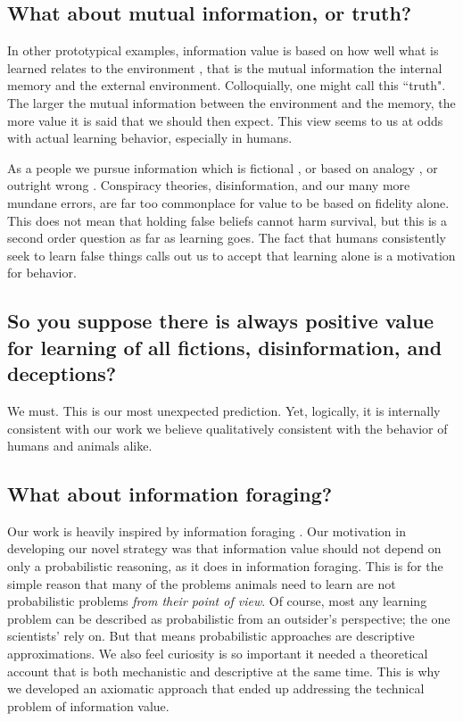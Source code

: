 \subsection*{What about mutual information, or truth?}
In other prototypical examples, information value is based on how well what is learned relates to the environment \citep{Behrens2007,Kolchinsky2018,Tishby2000}, that is the mutual information the internal memory and the external environment. Colloquially, one might call this ``truth". The larger the mutual information between the environment and the memory, the more value it is said that we should then expect. This view seems to us at odds with actual learning behavior, especially in humans. 

As a people we pursue information which is fictional \citep{sternisko2020dark}, or based on analogy \citep{gentner1997reasoning}, or outright wrong \citep{loftus1989misinformation}. Conspiracy theories, disinformation, and our many more mundane errors, are far too commonplace for value to be based on fidelity alone. This does not mean that holding false beliefs cannot harm survival, but this is a second order question as far as learning goes. The fact that humans consistently seek to learn false things calls out us to accept that learning alone is a motivation for behavior.


\subsection*{So you suppose there is always positive value for learning of all fictions, disinformation, and deceptions?}
We must. This is our most unexpected prediction. Yet, logically, it is internally consistent with our work we believe qualitatively consistent with the behavior of humans and animals alike.


\subsection*{What about information foraging?}
Our work is heavily inspired by information foraging \citep{Inglis2001,Reddy2016}. Our motivation in developing our novel strategy was that information value should not depend on only a probabilistic reasoning, as it does in information foraging. This is for the simple reason that many of the problems animals need to learn are not probabilistic problems \textit{from their point of view}. Of course, most any learning problem can be described as probabilistic from an outsider's perspective; the one scientists' rely on. But that means probabilistic approaches are descriptive approximations. We also feel curiosity is so important it needed a theoretical account that is both mechanistic and descriptive at the same time. This is why we developed an axiomatic approach that ended up addressing the technical problem of information value.


